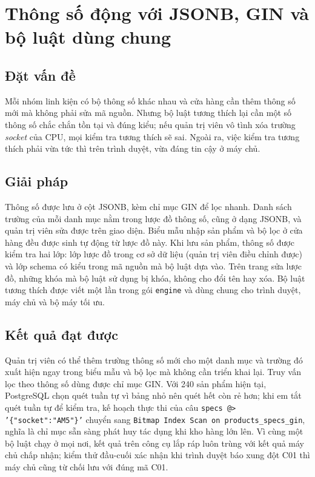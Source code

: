 \section{Thông số động với JSONB, GIN và bộ luật dùng chung}

\subsection{Đặt vấn đề}

Mỗi nhóm linh kiện có bộ thông số khác nhau và cửa hàng cần thêm thông số mới mà không phải sửa mã nguồn. Nhưng bộ luật tương thích lại cần một số thông số chắc chắn tồn tại và đúng kiểu; nếu quản trị viên vô tình xóa trường \emph{socket} của CPU, mọi kiểm tra tương thích sẽ sai. Ngoài ra, việc kiểm tra tương thích phải vừa tức thì trên trình duyệt, vừa đáng tin cậy ở máy chủ.

\subsection{Giải pháp}

Thông số được lưu ở cột JSONB, kèm chỉ mục GIN để lọc nhanh. Danh sách trường của mỗi danh mục nằm trong lược đồ thông số, cũng ở dạng JSONB, và quản trị viên sửa được trên giao diện. Biểu mẫu nhập sản phẩm và bộ lọc ở cửa hàng đều được sinh tự động từ lược đồ này. Khi lưu sản phẩm, thông số được kiểm tra hai lớp: lớp lược đồ trong cơ sở dữ liệu (quản trị viên điều chỉnh được) và lớp schema có kiểu trong mã nguồn mà bộ luật dựa vào. Trên trang sửa lược đồ, những khóa mà bộ luật sử dụng bị khóa, không cho đổi tên hay xóa. Bộ luật tương thích được viết một lần trong gói \texttt{engine} và dùng chung cho trình duyệt, máy chủ và bộ máy tối ưu.

\subsection{Kết quả đạt được}

Quản trị viên có thể thêm trường thông số mới cho một danh mục và trường đó xuất hiện ngay trong biểu mẫu và bộ lọc mà không cần triển khai lại. Truy vấn lọc theo thông số dùng được chỉ mục GIN. Với 240 sản phẩm hiện tại, PostgreSQL chọn quét tuần tự vì bảng nhỏ nên quét hết còn rẻ hơn; khi em tắt quét tuần tự để kiểm tra, kế hoạch thực thi của câu \texttt{specs @> '\{"socket":"AM5"\}'} chuyển sang \texttt{Bitmap Index Scan on products\_specs\_gin}, nghĩa là chỉ mục sẵn sàng phát huy tác dụng khi kho hàng lớn lên. Vì cùng một bộ luật chạy ở mọi nơi, kết quả trên công cụ lắp ráp luôn trùng với kết quả máy chủ chấp nhận; kiểm thử đầu-cuối xác nhận khi trình duyệt báo xung đột C01 thì máy chủ cũng từ chối lưu với đúng mã C01.

